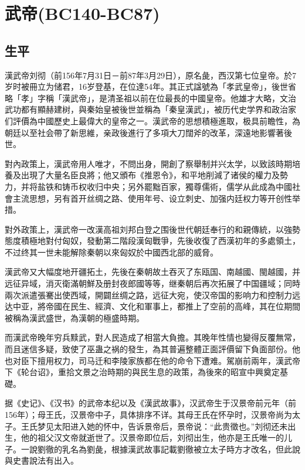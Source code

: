
\section{武帝\tiny(BC140-BC87)}

\subsection{生平}

漢武帝刘彻（前156年7月31日－前87年3月29日），原名彘，西汉第七位皇帝。於7岁时被冊立为储君，16岁登基，在位達54年。其正式諡號為「孝武皇帝」，後世省略「孝」字稱「漢武帝」，是清圣祖以前在位最長的中國皇帝。他雄才大略，文治武功都有顯赫建树，與秦始皇被後世並稱為「秦皇漢武」，被历代史学界和政治家们評價為中國歷史上最偉大的皇帝之一。漢武帝的思想積極進取，极具前瞻性，為朝廷以至社会帶了新思維，亲政後進行了多項大刀闊斧的改革，深遠地影響著後世。

對內政策上，漢武帝用人唯才，不問出身，開創了察舉制并兴太学，以致該時期培養及出現了大量名臣良將；他又頒布《推恩令》，和平地削減了诸侯的權力及勢力，并将盐铁和铸币权收归中央；另外罷黜百家，獨尊儒術，儒学从此成為中國社會主流思想，另有首开丝绸之路、使用年号、设立刺史、加强内廷权力等开创性举措。

對外政策上，漢武帝一改漢高祖刘邦白登之围後世代朝廷奉行的和親傳統，以強勢態度積極地對付匈奴，發動第二階段漢匈戰爭，先後收復了西漢初年的多處領土，不过终其一世未能解除秦朝以來匈奴於中國西北部的威脅。

漢武帝又大幅度地开疆拓土，先後在秦朝故土吞灭了东瓯国、南越國、閩越國，并远征异域，消灭衛滿朝鮮及册封夜郎國等等，继秦朝后再次拓展了中国疆域；同時兩次派遣張騫出使西域，開闢丝绸之路，远征大宛，使汉帝国的影响力和控制力远达中亚，將帝國在民生、經濟、文化和軍事上，都推上了空前的高峰，其在位期間被稱為漢武盛世，為漢朝的極盛時期。

而漢武帝晚年穷兵黩武，對人民造成了相當大負擔。其晚年性情也變得反覆無常，而且迷信多疑，致使了巫蛊之祸的發生，為其普遍整體正面評價留下負面部份。他也对臣下擅用权力，司马迁和李陵家族都在他的命令下遭难。駕崩前兩年，漢武帝下《轮台诏》，重拾文景之治時期的與民生息的政策，為後來的昭宣中興奠定基礎。

据《史记》、《汉书》的武帝本纪以及《漢武故事》，汉武帝生于汉景帝前元年（前156年）；母王氏，汉景帝中子，具体排序不详。其母王氏在怀孕时，汉景帝尚为太子。王氏梦见太阳进入她的怀中，告诉景帝后，景帝说：“此贵徵也。”刘彻还未出生，他的祖父汉文帝就逝世了。汉景帝即位后，刘彻出生，他亦是王氏唯一的儿子。一說劉徹的乳名為劉彘，根據漢武故事記載劉徹被立太子時方才改名，但此說與史書說法有出入。

